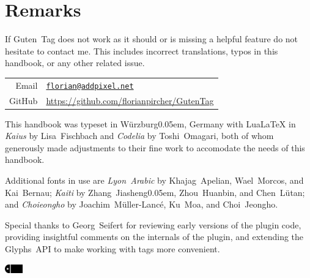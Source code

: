 \chapter{Remarks}%
\label{cha:remarks}

If Guten~Tag does not work as it should or is missing a helpful feature do not hesitate to contact me. This includes incorrect translations, typos in this handbook, or any other related issue.

\setlength{\tabcolsep}{0pt}
\medbreak\begin{tabular}{rl}
  Email  & \capskip\href{mailto:florian@addpixel.net}{\texttt{florian@addpixel.net}}\\
  GitHub & \capskip\url{https://github.com/florianpircher/GutenTag} \\
\end{tabular}

\medbreak\noindent This handbook was typeset in Würzburg\kern0.05em, Germany
with {Lua\LaTeX} in \emph{Kaius} by Lisa~Fischbach and \emph{Codelia} by Toshi~Omagari,
both of whom generously made adjustments to their fine work to accomodate the needs of this handbook.

\bigbreak\noindent Additional fonts in use are \emph{Lyon~Arabic} by Khajag~Apelian, Wael~Morcos, and Kai~Bernau;
\emph{Kaiti} by Zhang~Jiasheng\kern0.05em, Zhou~Huanbin, and Chen~Lütan;
and \emph{Choieongho} by Joachim~Müller-Lancé, Ku~Moa, and Choi~Jeongho.

\bigbreak\noindent Special thanks to Georg~Seifert for reviewing early versions of the plugin code,
providing insightful comments on the internals of the plugin, and
extending the Glyphs~API to make working with tags more convenient.

\bigbreak

\begin{center}
  \includegraphics[height=1em]{Images/Tag.pdf} \\
  {}
\end{center}
